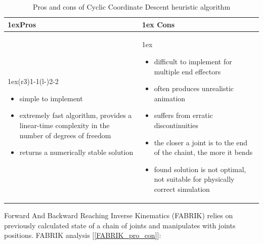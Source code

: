 \documentclass[a4paper]{report}
\begin{document}
\begin{table}[H]
\begin{tabularx}{\linewidth}{>{\parskip1ex}X@{\kern4\tabcolsep}>{\parskip1ex}X}
\toprule
\hfil\bfseries Pros
&
\hfil\bfseries Cons
\\\cmidrule(r{3\tabcolsep}){1-1}\cmidrule(l{-\tabcolsep}){2-2}

\begin{itemize}
    \item simple to implement 
    \item extremely fast algorithm, provides a linear-time complexity in the number of degrees of freedom \cite{IKtechniques}
    \item returns a numerically stable solution \cite{IKtechniques}
\end{itemize}

&


\begin{itemize}
    \item difficult to implement for multiple end effectors \cite{IKtechniques}
    \item often produces unrealistic animation \cite{IKtechniques}
    \item suffers from erratic discontinuities \cite{IKtechniques}
    \item the closer a joint is to the end of the chaint, the more it bends \cite{IKtechniques}
    \item found solution is not optimal, not suitable for physically correct simulation
\end{itemize}

\\\bottomrule
\end{tabularx}
\caption{Pros and cons of Cyclic Coordinate Descent heuristic algorithm}
\label{CCD_pro_con}
\end{table}




\bigskip Forward And Backward Reaching Inverse Kinematics (FABRIK) relies on previously calculated state of a chain of joints and manipulates with joints positions. FABRIK analysis [\ref{FABRIK_pro_con}]:
\end{document}
